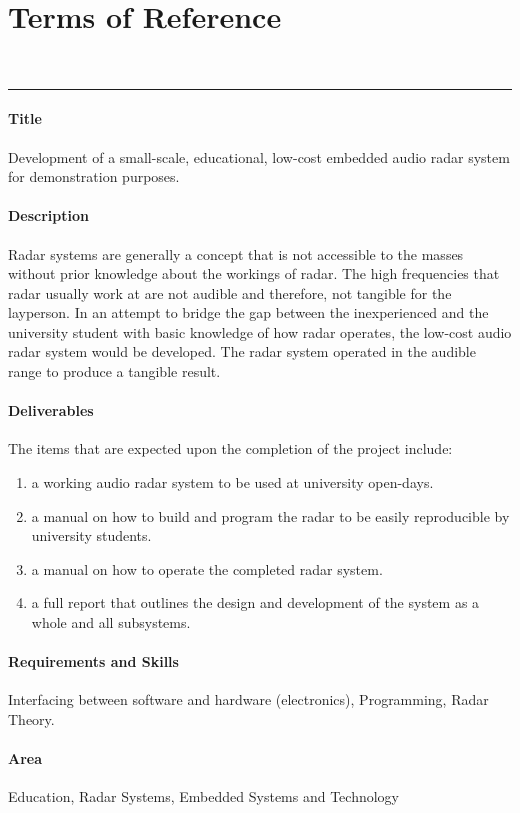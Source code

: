 {\smallest\chapter*{Terms of Reference}\label{chap:Terms of Reference}}\\
\hrule
\subsubsection*{Title}
Development of a small-scale, educational, low-cost embedded audio radar system for demonstration purposes.
\subsubsection*{Description}
Radar systems are generally a concept that is not accessible to the masses without prior knowledge about the workings of radar. The high frequencies that radar usually work at are not audible and therefore, not tangible for the layperson. In an attempt to bridge the gap between the inexperienced and the university student with basic knowledge of how radar operates, the low-cost audio radar system would be developed. The radar system operated in the audible range to produce a tangible result.
\subsubsection{Deliverables}
The items that are expected upon the completion of the project include:
\begin{enumerate}
\item 	a working audio radar system to be used at university open-days.
\item 	a manual on how to build and program the radar to be easily reproducible by university students.
\item 	a manual on how to operate the completed radar system.
\item 	a full report that outlines the design and development of the system as a whole and all subsystems.
\end{enumerate}
\subsubsection*{Requirements and Skills}
Interfacing between software and hardware (electronics), Programming, Radar Theory.
\subsubsection*{Area}
Education, Radar Systems, Embedded Systems and Technology
\fancyfoot[C]{\thepage}
\pagestyle{plain}
\newpage